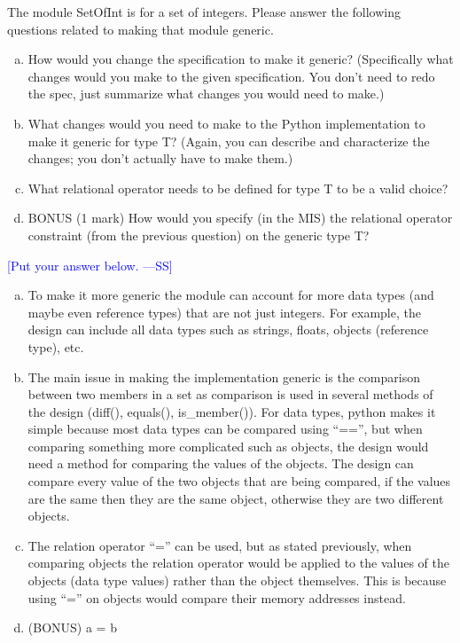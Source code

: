 \documentclass[12pt,fleqn]{examtst}
\newcommand{\authornote}[3]{\textcolor{#1}{[#3 ---#2]}}
\newcommand{\authornote}[3]{}
\newcommand{\wss}[1]{\authornote{blue}{SS}{#1}}
\begin{document}

\newpage

\noindent
\begin{minipage}{\textwidth}

The module SetOfInt is for a set of integers.  Please answer the following
questions related to making that module generic. 
\begin{enumerate}[a.]
\item How would you change the specification to make it generic?  (Specifically
  what changes would you make to the given specification.  You don't need to
  redo the spec, just summarize what changes you would need to make.)
\item What changes would you need to make to the Python
implementation to make it generic for type T?  (Again, you can describe and
characterize the changes; you don't actually have to make them.)
\item What relational operator needs to be defined for type T to be a valid
  choice?
\item BONUS (1 mark) How would you specify (in the MIS) the relational operator
  constraint (from the previous question) on the generic type T?
\end{enumerate}

\wss{Put your answer below.}

\begin{enumerate}[a.]
\item
  To make it more generic the module can account for more data types (and maybe even reference types) that are not just integers. For example, the design can include all data types such as strings, floats, objects (reference type), etc.
\item
  The main issue in making the implementation generic is the comparison between two members in a set as comparison is used in several methods of the design (diff(), equals(), is\_member()). For data types, python makes it simple because most data types can be compared using “==”, but when comparing something more complicated such as objects, the design would need a method for comparing the values of the objects. The design can compare every value of the two objects that are being compared, if the values are the same then they are the same object, otherwise they are two different objects. 
\item
  The relation operator “=” can be used, but as stated previously, when comparing objects the relation operator would be applied to the values of the objects (data type values) rather than the object themselves. This is because using “=” on objects would compare their memory addresses instead. 
\item (BONUS)
  a = b
\end{enumerate}

\end{minipage}
\end{document}
